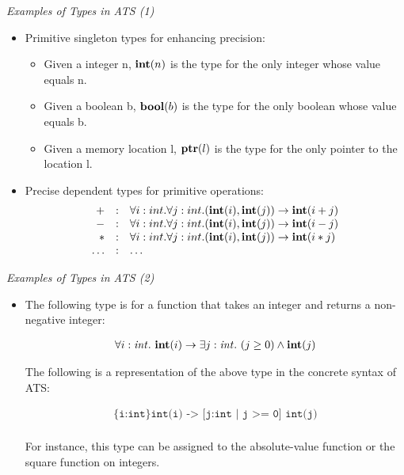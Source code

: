 \documentclass[pdf]{prosper}
\def\sint{{\it int}}
\def\tint{\mbox{\bf int}}
\def\tptr{\mbox{\bf ptr}}
\def\tbool{\mbox{\bf bool}}
\def\Band{\land}
\def\timp{\rightarrow}
\begin{document}
\begin{slide}{\em Examples of Types in ATS (1)}

\begin{itemize}
\item Primitive singleton types for enhancing precision:
\begin{itemize}
\item Given a integer n, $\tint(n)$ is the type for the only integer whose
  value equals n.
\item Given a boolean b, $\tbool(b)$ is the type for the only boolean whose
  value equals b.
\item Given a memory location l, $\tptr(l)$ is the type for the only pointer to the
  location l.
\end{itemize}

\item Precise dependent types for primitive operations:
$$\begin{array}{rcl}
{+} & : & \forall i:int.\forall j:int.(\tint(i), \tint(j))\timp \tint(i+j) \\
{-} & : & \forall i:int.\forall j:int.(\tint(i), \tint(j))\timp \tint(i-j) \\
{*} & : & \forall i:int.\forall j:int.(\tint(i), \tint(j))\timp \tint(i*j) \\
\ldots & : & \ldots \\
\end{array}$$

\end{itemize}
\end{slide}
\begin{slide}{\em Examples of Types in ATS (2)}
\begin{itemize}
\item

The following type is for a function that takes an integer and returns
a non-negative integer:

$$\begin{array}{l}
\forall i:\sint.~\tint(i) \timp \exists j:\sint.~(j \geq 0)\Band\tint(j) \\
\end{array}$$

The following is a representation of the above type in the concrete syntax
of ATS:

$$\begin{array}{l}
\texttt{\{i:int\} int(i) -> [j:int | j >= 0] int(j)} \\
\end{array}$$

For instance, this type can be assigned to the absolute-value function
or the square function on integers.

\end{itemize}
\end{slide}
\end{document}
